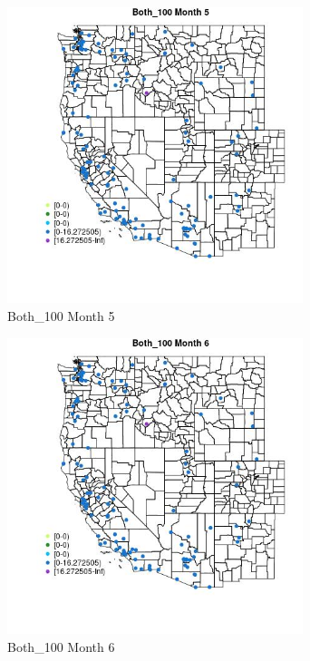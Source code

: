 \begin{figure} 
\centering  
\includegraphics[width=0.77\textwidth]{Code_Outputs/Report_ML_input_PM25_Step4_part_e_de_duplicated_aves_MapObsMo5Both_100.jpg} 
\caption{\label{fig:Report_ML_input_PM25_Step4_part_e_de_duplicated_avesMapObsMo5Both_100}Both_100 Month 5} 
\end{figure} 
 

\begin{figure} 
\centering  
\includegraphics[width=0.77\textwidth]{Code_Outputs/Report_ML_input_PM25_Step4_part_e_de_duplicated_aves_MapObsMo6Both_100.jpg} 
\caption{\label{fig:Report_ML_input_PM25_Step4_part_e_de_duplicated_avesMapObsMo6Both_100}Both_100 Month 6} 
\end{figure} 
 

